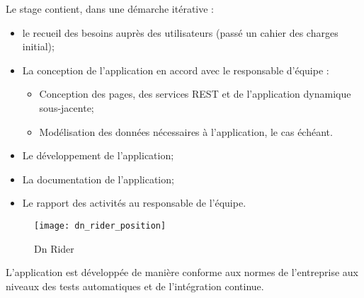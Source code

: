 Le stage contient, dans une démarche itérative :
\begin{itemize}
  \item le recueil des besoins auprès des utilisateurs (passé un cahier des charges initial);
  \item La conception de l’application en accord avec le responsable d’équipe :
  \begin{itemize}
    \item Conception des pages, des services REST et de l’application dynamique sous-jacente;
    \item Modélisation des données nécessaires à l’application, le cas échéant.
  \end{itemize}
  \item Le développement de l’application;
  \item La documentation de l’application;
  \item Le rapport des activités au responsable de l’équipe.
\end{itemize}

\begin{figure}[ht]
 \centering
 \texttt{[image: dn\_rider\_position]}
 \caption{Dn Rider}
\end{figure}

L'application est développée de manière conforme aux normes de l'entreprise aux niveaux des tests automatiques et de l'intégration continue.

\clearpage
